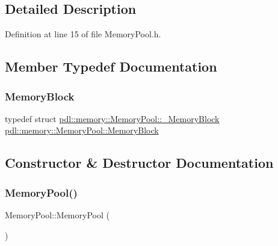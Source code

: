 \subsection{Detailed Description}


Definition at line 15 of file Memory\+Pool.\+h.



\subsection{Member Typedef Documentation}
\mbox{\label{classpdl_1_1memory_1_1_memory_pool_ae6b2ec19cb71cae4fa60b7d342a1743b}} 
\subsubsection{\texorpdfstring{MemoryBlock}{MemoryBlock}}
{\footnotesize\ttfamily typedef struct \mbox{\hyperlink{structpdl_1_1memory_1_1_memory_pool_1_1___memory_block}{pdl\+::memory\+::\+Memory\+Pool\+::\+\_\+\+Memory\+Block}}  \mbox{\hyperlink{classpdl_1_1memory_1_1_memory_pool_ae6b2ec19cb71cae4fa60b7d342a1743b}{pdl\+::memory\+::\+Memory\+Pool\+::\+Memory\+Block}}}



\subsection{Constructor \& Destructor Documentation}
\mbox{\label{classpdl_1_1memory_1_1_memory_pool_ae18fdcc408eed42d1cadd8e402ae39ff}} 
\subsubsection{\texorpdfstring{MemoryPool()}{MemoryPool()}}
{\footnotesize\ttfamily Memory\+Pool\+::\+Memory\+Pool (\begin{DoxyParamCaption}{ }\end{DoxyParamCaption})\hspace{0.3cm}{\ttfamily [private]}}



